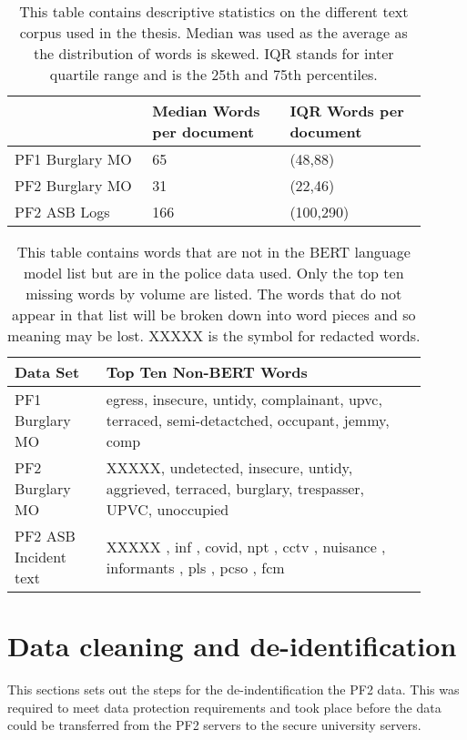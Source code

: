 \begin{table}[]
\centering
\begin{tabular}{p{0.3\linewidth}p{0.3\linewidth}p{0.3\linewidth}} 
\toprule
                         & Median Words per document & IQR  Words per document \\\midrule
PF1 Burglary MO    &          65                 &           (48,88)                                               \\
PF2 Burglary MO &          31                 &    (22,46)                                         \\
PF2 ASB Logs      &           166                &         (100,290)                              \\  \bottomrule
\end{tabular}
\caption[Text data descriptive statistics]{\label{tab:corpus_stats} This table contains descriptive statistics on the different text corpus used in the thesis. Median was used as the average as the distribution of words is skewed. IQR stands for inter quartile range and is the 25th and 75th percentiles. }
\end{table}

\begin{table}[]
\centering
\begin{tabular}{p{0.2\linewidth}p{0.7\linewidth}}
\toprule
Data Set& Top Ten Non-BERT Words                                       \\ \midrule
PF1 Burglary MO       &  egress, insecure, untidy, complainant, upvc, terraced, semi-detactched, occupant, jemmy, comp  \\
PF2 Burglary MO       & XXXXX, undetected, insecure, untidy, aggrieved, terraced, burglary, trespasser, UPVC, unoccupied \\
PF2 ASB Incident text &  XXXXX , inf , covid, npt , cctv , nuisance , informants , pls , pcso , fcm       \\ \bottomrule
\end{tabular}
\caption[Non-Bert words PF1 and PF2 data]{\label{tab:non_bert_words} This table contains words that are not in the BERT language model list but are in the police data used. Only the top ten missing words by volume are listed. The words that do not appear in that list will be broken down into word pieces and so meaning may be lost. XXXXX is the symbol for redacted words.}
\end{table}
\section{Data cleaning and de-identification} This sections sets out the steps for the de-indentification the PF2 data.  This was required to meet data protection requirements and took place before the data could be transferred from the PF2 servers to the secure university servers.


